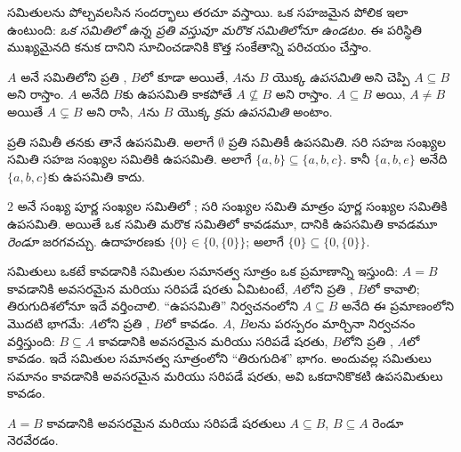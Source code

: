 \documentclass[../../../include/open-logic-section]{subfiles}
\begin{document}

\begin{explain}
సమితులను పోల్చవలసిన సందర్భాలు తరచూ వస్తాయి. ఒక సహజమైన పోలిక
ఇలా ఉంటుంది: \emph{ఒక సమితిలో ఉన్న ప్రతి వస్తువూ మరొక సమితిలోనూ
ఉండటం}. ఈ పరిస్థితి ముఖ్యమైనది కనుక దానిని సూచించడానికి కొత్త
సంకేతాన్ని పరిచయం చేస్తాం.
\end{explain}

\begin{defn}[ఉపసమితి]
$A$ అనే సమితిలోని ప్రతి , $B$లో కూడా 
అయితే, $A$ను $B$ యొక్క \emph{ఉపసమితి} అని చెప్పి
$A \subseteq B$ అని రాస్తాం. $A$ అనేది $B$కు ఉపసమితి కాకపోతే
$A \not\subseteq B$ అని రాస్తాం.
$A \subseteq B$ అయి, $A \neq B$ అయితే $A \subsetneq B$ అని రాసి,
$A$ను $B$ యొక్క \emph{క్రమ ఉపసమితి} అంటాం.
\end{defn}

\begin{ex}
ప్రతి సమితీ తనకు తానే ఉపసమితి. అలాగే $\emptyset$ ప్రతి సమితికీ
ఉపసమితి. సరి సహజ సంఖ్యల సమితి సహజ సంఖ్యల సమితికి ఉపసమితి.
అలాగే $\{ a, b \} \subseteq \{ a, b, c \}$.
కానీ $\{ a, b, e \}$ అనేది $\{ a, b, c \}$కు ఉపసమితి కాదు.
\end{ex}

\begin{ex}
$2$ అనే సంఖ్య పూర్ణ సంఖ్యల సమితిలో ; సరి సంఖ్యల
సమితి మాత్రం పూర్ణ సంఖ్యల సమితికి ఉపసమితి. అయితే ఒక సమితి
మరొక సమితిలో  కావడమూ, దానికి ఉపసమితి కావడమూ
\emph{రెండూ} జరగవచ్చు. ఉదాహరణకు $\{0\} \in \{0, \{0\}\}$;
అలాగే $\{0\} \subseteq \{0, \{0\}\}$.
\end{ex}

సమితులు ఒకటే కావడానికి సమితుల సమానత్వ సూత్రం ఒక ప్రమాణాన్ని ఇస్తుంది:
$A = B$ కావడానికి అవసరమైన మరియు సరిపడే షరతు ఏమిటంటే,
$A$లోని ప్రతి , $B$లో  కావాలి;
తిరుగుదిశలోనూ ఇదే వర్తించాలి. ``ఉపసమితి'' నిర్వచనంలోని
$A \subseteq B$ అనేది ఈ ప్రమాణంలోని మొదటి భాగమే:
$A$లోని ప్రతి , $B$లో  కావడం.
$A$, $B$లను పరస్పరం మార్చినా నిర్వచనం వర్తిస్తుంది:
$B \subseteq A$ కావడానికి అవసరమైన మరియు సరిపడే షరతు,
$B$లోని ప్రతి , $A$లో  కావడం.
ఇదే సమితుల సమానత్వ సూత్రంలోని ``తిరుగుదిశ'' భాగం.
అందువల్ల సమితులు సమానం కావడానికి అవసరమైన మరియు సరిపడే షరతు,
అవి ఒకదానికొకటి ఉపసమితులు కావడం.

\begin{prop}
$A = B$ కావడానికి అవసరమైన మరియు సరిపడే షరతులు
$A \subseteq B$, $B \subseteq A$ రెండూ నెరవేరడం.
\end{prop}
\end{document}
